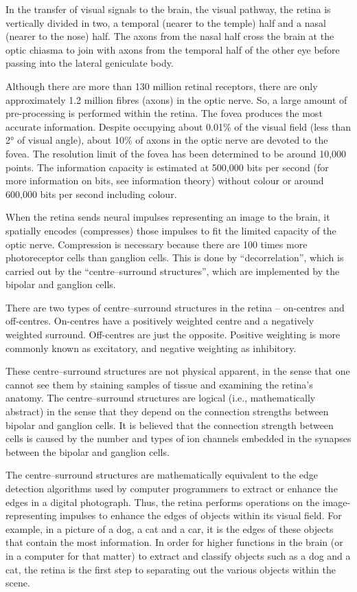 In the transfer of visual signals to the brain, the visual pathway, the retina is vertically divided in two, a temporal (nearer to the temple) half and a nasal (nearer to the nose) half. The axons from the nasal half cross the brain at the optic chiasma to join with axons from the temporal half of the other eye before passing into the lateral geniculate body.

Although there are more than 130 million retinal receptors, there are only approximately 1.2 million fibres (axons) in the optic nerve. So, a large amount of pre-processing is performed within the retina. The fovea produces the most accurate information. Despite occupying about 0.01\% of the visual field (less than 2° of visual angle), about 10\% of axons in the optic nerve are devoted to the fovea. The resolution limit of the fovea has been determined to be around 10,000 points. The information capacity is estimated at 500,000 bits per second (for more information on bits, see information theory) without colour or around 600,000 bits per second including colour.

When the retina sends neural impulses representing an image to the brain, it spatially encodes (compresses) those impulses to fit the limited capacity of the optic nerve. Compression is necessary because there are 100 times more photoreceptor cells than ganglion cells. This is done by ``decorrelation'', which is carried out by the ``centre--surround structures'', which are implemented by the bipolar and ganglion cells.

There are two types of centre--surround structures in the retina -- on-centres and off-centres. On-centres have a positively weighted centre and a negatively weighted surround. Off-centres are just the opposite. Positive weighting is more commonly known as excitatory, and negative weighting as inhibitory.

These centre--surround structures are not physical apparent, in the sense that one cannot see them by staining samples of tissue and examining the retina's anatomy. The centre--surround structures are logical (i.e., mathematically abstract) in the sense that they depend on the connection strengths between bipolar and ganglion cells. It is believed that the connection strength between cells is caused by the number and types of ion channels embedded in the synapses between the bipolar and ganglion cells.

The centre--surround structures are mathematically equivalent to the edge detection algorithms used by computer programmers to extract or enhance the edges in a digital photograph. Thus, the retina performs operations on the image-representing impulses to enhance the edges of objects within its visual field. For example, in a picture of a dog, a cat and a car, it is the edges of these objects that contain the most information. In order for higher functions in the brain (or in a computer for that matter) to extract and classify objects such as a dog and a cat, the retina is the first step to separating out the various objects within the scene.

